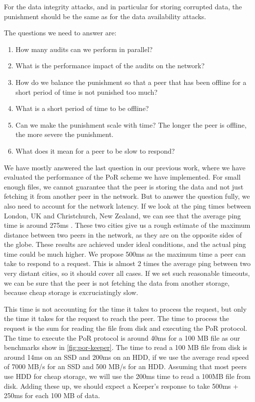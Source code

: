 For the data integrity attacks, and in particular for storing corrupted data,
the punishment should be the same as for the data availability attacks.

The questions we need to answer are:
\begin{enumerate}
    \item How many audits can we perform in parallel?
    \item What is the performance impact of the audits on the network?
    \item How do we balance the punishment so that a peer that has been offline for a short period of time
        is not punished too much?
    \item What is a short period of time to be offline?
    \item Can we make the punishment scale with time? The longer the peer is offline, the more severe the punishment.
    \item What does it mean for a peer to be slow to respond?
\end{enumerate}

We have mostly answered the last question in our previous work, where we have evaluated the performance of
the PoR scheme we have implemented.
For small enough files, we cannot guarantee that the peer is storing the data
and not just fetching it from another peer in the network.
But to answer the question fully, we also need to account for the network latency.
If we look at the ping times between London, UK and Christchurch, New Zealand,
we can see that the average ping time is around 275ms \cite{pingtimes}.
These two cities give us a rough estimate of the maximum distance between two peers in the network,
as they are on the opposite sides of the globe.
These results are achieved under ideal conditions, and the actual ping time could be much higher.
We propose 500ms as the maximum time a peer can take to respond to a request.
This is almost 2 times the average ping between two very distant cities, so it should cover all cases.
If we set such reasonable timeouts, we can be sure that the peer is not
fetching the data from another storage, because cheap storage is excruciatingly slow.

This time is not accounting for the time it takes to process the request, but only the time it takes for the
request to reach the peer.
The time to process the request is the sum for reading the file from disk and executing the PoR protocol.
The time to execute the PoR protocol is around 40ms for a 100 MB file as our benchmarks show in \autoref{fig:por-keeper}.
The time to read a 100 MB file from disk is around 14ms on an SSD and 200ms on an HDD, if we
use the average read speed of 7000 MB/s for an SSD and 500 MB/s for an HDD.
Assuming that most peers use HDD for cheap storage, we will use the 200ms time to read a 100MB file from disk.
Adding these up, we should expect a Keeper's response to take 500ms + 250ms for each 100 MB of data.

